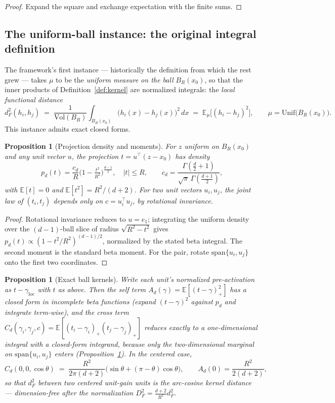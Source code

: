 \documentclass[11pt]{article}
\newtheorem{proposition}[theorem]{Proposition}
\theoremstyle{remark}
\newcommand{\E}{\mathbb{E}}
\newcommand{\abs}[1]{\left\lvert #1 \right\rvert}
\begin{document}
\begin{proof} Expand the square and exchange expectation with the finite
sums. \end{proof}

\subsection{The uniform-ball instance: the original integral definition}
\label{sec:ball}

The framework's first instance --- historically the definition from which the
rest grew --- takes $\mu$ to be the \emph{uniform measure on the ball}
$B_{R}(x_0)$, so that the inner products of Definition~\ref{def:kernel} are
normalized integrals: the \emph{local functional distance}
\[
  d_F^2(h_i,h_j) \;=\; \frac{1}{\mathrm{Vol}(B_{R})}
  \int_{B_{R}(x_0)} \big(h_i(x) - h_j(x)\big)^2\, dx
  \;=\; \E_{\mu}\big[(h_i - h_j)^2\big],
  \qquad \mu = \mathrm{Unif}\big(B_R(x_0)\big).
\]
This instance admits exact closed forms.

\begin{proposition}[Projection density and moments]\label{prop:balldensity}
For $z$ uniform on $B_R(x_0)$ and any unit vector $u$, the projection
$t = u^\top (z - x_0)$ has density
\[
  p_d(t) = \frac{c_d}{R}\Big(1 - \tfrac{t^2}{R^2}\Big)^{\frac{d-1}{2}},
  \quad \abs{t}\le R, \qquad
  c_d = \frac{\Gamma(\tfrac d2 + 1)}{\sqrt{\pi}\,\Gamma(\tfrac{d+1}{2})},
\]
with $\E[t] = 0$ and $\E[t^2] = R^2/(d+2)$. For two unit vectors
$u_i, u_j$, the joint law of $(t_i, t_j)$ depends only on
$c = u_i^\top u_j$, by rotational invariance.
\end{proposition}

\begin{proof}
Rotational invariance reduces to $u = e_1$; integrating the uniform density
over the $(d{-}1)$-ball slice of radius $\sqrt{R^2 - t^2}$ gives
$p_d(t) \propto (1 - t^2/R^2)^{(d-1)/2}$, normalized by the stated beta
integral. The second moment is the standard beta moment. For the pair,
rotate $\mathrm{span}\{u_i,u_j\}$ onto the first two coordinates.
\end{proof}

\begin{proposition}[Exact ball kernels]\label{prop:ballkernels}
Write each unit's normalized pre-activation as $t - \gamma_{\mathrm{loc}}$
with $t$ as above. Then the self term
$A_d(\gamma) = \E[(t-\gamma)_+^2]$ has a closed form in incomplete beta
functions (expand $(t-\gamma)^2$ against $p_d$ and integrate term-wise), and
the cross term
$C_d(\gamma_i,\gamma_j,c) = \E[(t_i-\gamma_i)_+(t_j-\gamma_j)_+]$
reduces \emph{exactly} to a one-dimensional integral with a closed-form
integrand, because only the two-dimensional marginal on
$\mathrm{span}\{u_i,u_j\}$ enters (Proposition~\ref{prop:balldensity}).
In the centered case,
\[
  C_d(0,0,\cos\theta) \;=\; \frac{R^2}{2\pi(d+2)}
  \big(\sin\theta + (\pi - \theta)\cos\theta\big),
  \qquad
  A_d(0) = \frac{R^2}{2(d+2)},
\]
so that $d_F^2$ between two centered unit-gain units is the arc-cosine
kernel distance --- dimension-free after the normalization
$D_F^2 = \tfrac{d+2}{R^2} d_F^2$.
\end{proposition}
\end{document}
